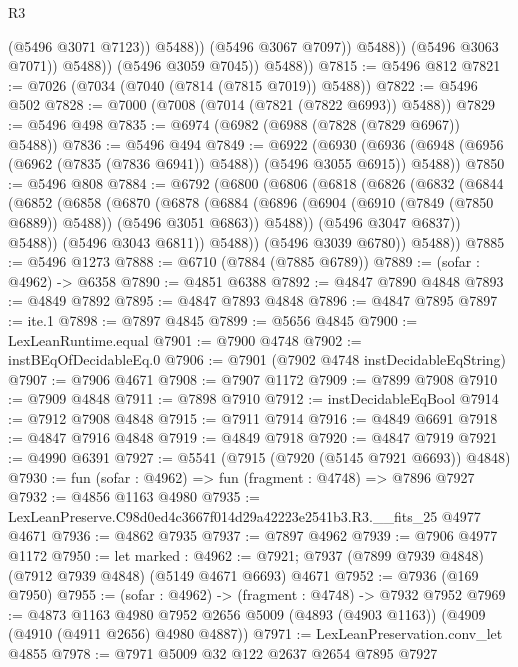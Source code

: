 \begin{lexlean}{R3}
\begin{coremodule}
                            (@5496 @3071 @7123))
                          @5488))
                      (@5496 @3067 @7097))
                    @5488))
                (@5496 @3063 @7071))
              @5488))
          (@5496 @3059 @7045))
        @5488))
@7815 := @5496 @812
@7821 := @7026 (@7034 (@7040 (@7814 (@7815 @7019)) @5488))
@7822 := @5496 @502
@7828 := @7000 (@7008 (@7014 (@7821 (@7822 @6993)) @5488))
@7829 := @5496 @498
@7835 := @6974 (@6982 (@6988 (@7828 (@7829 @6967)) @5488))
@7836 := @5496 @494
@7849 := @6922
    (@6930 (@6936 (@6948 (@6956 (@6962 (@7835 (@7836 @6941)) @5488)) (@5496 @3055 @6915)) @5488))
@7850 := @5496 @808
@7884 := @6792
    (@6800
      (@6806
        (@6818
          (@6826
            (@6832
              (@6844
                (@6852
                  (@6858
                    (@6870
                      (@6878
                        (@6884
                          (@6896 (@6904 (@6910 (@7849 (@7850 @6889)) @5488)) (@5496 @3051 @6863))
                          @5488))
                      (@5496 @3047 @6837))
                    @5488))
                (@5496 @3043 @6811))
              @5488))
          (@5496 @3039 @6780))
        @5488))
@7885 := @5496 @1273
@7888 := @6710 (@7884 (@7885 @6789))
@7889 := (sofar : @4962) -> @6358
@7890 := @4851 @6388
@7892 := @4847 @7890 @4848
@7893 := @4849 @7892
@7895 := @4847 @7893 @4848
@7896 := @4847 @7895
@7897 := ite.{1}
@7898 := @7897 @4845
@7899 := @5656 @4845
@7900 := LexLeanRuntime.equal
@7901 := @7900 @4748
@7902 := instBEqOfDecidableEq.{0}
@7906 := @7901 (@7902 @4748 instDecidableEqString)
@7907 := @7906 @4671
@7908 := @7907 @1172
@7909 := @7899 @7908
@7910 := @7909 @4848
@7911 := @7898 @7910
@7912 := instDecidableEqBool
@7914 := @7912 @7908 @4848
@7915 := @7911 @7914
@7916 := @4849 @6691
@7918 := @4847 @7916 @4848
@7919 := @4849 @7918
@7920 := @4847 @7919
@7921 := @4990 @6391
@7927 := @5541 (@7915 (@7920 (@5145 @7921 @6693)) @4848)
@7930 := fun (sofar : @4962) => fun (fragment : @4748) => @7896 @7927
@7932 := @4856 @1163 @4980
@7935 := LexLeanPreserve.C98d0ed4c3667f014d29a42223e2541b3.R3.__fits_25 @4977 @4671
@7936 := @4862 @7935
@7937 := @7897 @4962
@7939 := @7906 @4977 @1172
@7950 := let marked : @4962 := @7921;
  @7937 (@7899 @7939 @4848) (@7912 @7939 @4848) (@5149 @4671 @6693) @4671
@7952 := @7936 (@169 @7950)
@7955 := (sofar : @4962) -> (fragment : @4748) -> @7932 @7952
@7969 := @4873
    @1163
    @4980
    @7952
    @2656
    @5009
    (@4893 (@4903 @1163))
    (@4909 (@4910 (@4911 @2656) @4980 @4887))
@7971 := LexLeanPreservation.conv_let @4855
@7978 := @7971 @5009 @32 @122 @2637 @2654 @7895 @7927

\end{coremodule}
\end{lexlean}
